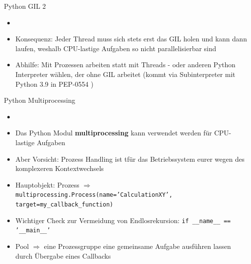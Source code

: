 \begin{frame}{Python GIL 2}
                 \begin{itemize}
        \setlength{\itemindent}{1.0in}
        \item [\textbf{Was heißt das? }]
    \end{itemize}
    \begin{itemize}
        \item Konsequenz:  Jeder Thread muss sich stets erst das GIL holen und kann dann laufen, weshalb CPU-lastige Aufgaben so nicht parallelisierbar sind
         \item Abhilfe:  Mit Prozessen arbeiten statt mit Threads - oder anderen Python Interpreter wählen, der ohne GIL arbeitet (kommt via Subinterpreter mit Python 3.9 in PEP-0554 \cite{python.org/dev/peps/pep-0554})
    \end{itemize}
    
    \end{frame}

\begin{frame}{Python Multiprocessing}
          \begin{itemize}
        \setlength{\itemindent}{1.4in}
        \item [\textbf{Multiprocessing Modul}]
    \end{itemize}
    \begin{itemize}
        \item Das Python Modul \textbf{multiprocessing} kann verwendet werden für CPU-lastige Aufgaben
        \item Aber Vorsicht: Prozess Handling ist tfür das Betriebssystem eurer wegen des komplexeren Kontextwechsels
        \item Hauptobjekt: Prozess $\Rightarrow$   \texttt{multiprocessing.Process(name='CalculationXY', target=my\_callback\_function)}
        \item Wichtiger Check zur Vermeidung von Endlosrekursion:   \texttt{if \_\_name\_\_ == '\_\_main\_\_'}
        \item Pool $\Rightarrow$ eine Prozessgruppe eine gemeinsame Aufgabe ausführen lassen durch Übergabe eines Callbacks
    \end{itemize}
\end{frame}

